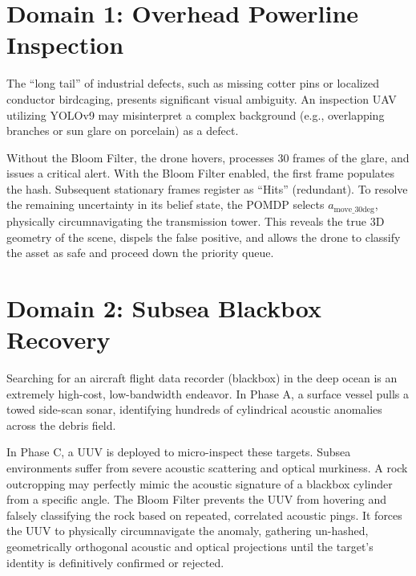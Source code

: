 \documentclass[conference]{IEEEtran}
\begin{document}
\section{Domain 1: Overhead Powerline Inspection}
The ``long tail'' of industrial defects, such as missing cotter pins or localized conductor birdcaging, presents significant visual ambiguity. An inspection UAV utilizing YOLOv9 may misinterpret a complex background (e.g., overlapping branches or sun glare on porcelain) as a defect.

Without the Bloom Filter, the drone hovers, processes 30 frames of the glare, and issues a critical alert. With the Bloom Filter enabled, the first frame populates the hash. Subsequent stationary frames register as ``Hits'' (redundant). To resolve the remaining uncertainty in its belief state, the POMDP selects $a_{\text{move\_30deg}}$, physically circumnavigating the transmission tower. This reveals the true 3D geometry of the scene, dispels the false positive, and allows the drone to classify the asset as safe and proceed down the priority queue.

\section{Domain 2: Subsea Blackbox Recovery}
Searching for an aircraft flight data recorder (blackbox) in the deep ocean is an extremely high-cost, low-bandwidth endeavor. In Phase A, a surface vessel pulls a towed side-scan sonar, identifying hundreds of cylindrical acoustic anomalies across the debris field.

In Phase C, a UUV is deployed to micro-inspect these targets. Subsea environments suffer from severe acoustic scattering and optical murkiness. A rock outcropping may perfectly mimic the acoustic signature of a blackbox cylinder from a specific angle. The Bloom Filter prevents the UUV from hovering and falsely classifying the rock based on repeated, correlated acoustic pings. It forces the UUV to physically circumnavigate the anomaly, gathering un-hashed, geometrically orthogonal acoustic and optical projections until the target's identity is definitively confirmed or rejected.
\end{document}
